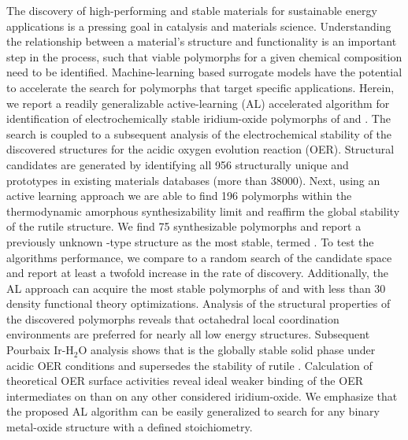 %



\noindent The discovery of high-performing and stable materials for sustainable energy applications is a pressing goal in catalysis and materials science.
%
Understanding the relationship between a material's structure and functionality is an important step in the process, such that viable polymorphs for a given chemical composition need to be identified.
%
Machine-learning based surrogate models have the potential to accelerate the search for polymorphs that target specific applications.
%
Herein, we report a readily generalizable active-learning (AL) accelerated algorithm for identification of electrochemically stable iridium-oxide polymorphs of \IrOtwo and \IrOthree.
%
The search is coupled to a subsequent analysis of the electrochemical stability of the discovered structures for the acidic oxygen evolution reaction (OER).
%
Structural candidates are generated by identifying all \num{956} structurally unique \ABtwo and \ABthree prototypes in existing materials databases (more than \num{38000}).
%
Next, using an active learning approach we are able to find \num{196} \IrOtwo polymorphs within the thermodynamic amorphous synthesizability limit and reaffirm the global stability of the rutile structure.
%
We find \num{75} synthesizable \IrOthree polymorphs and report a previously unknown -type structure as the most stable, termed \aIrOthree.
%
To test the algorithms performance,
we compare to a random search of the candidate space and report at least a twofold increase in the rate of discovery.
%
Additionally, the AL approach can acquire the most stable polymorphs of \IrOtwo and \IrOthree with less than \num{30} density functional theory optimizations.
%
Analysis of the structural properties of the discovered polymorphs reveals that octahedral local coordination environments are preferred for nearly all low energy structures.
%
Subsequent Pourbaix Ir-H$_2$O analysis shows that \aIrOthree is the globally stable solid phase under acidic OER conditions and supersedes the stability of rutile \IrOtwo.
%
Calculation of theoretical OER surface activities reveal ideal weaker binding of the OER intermediates on \aIrOthree than on any other considered iridium-oxide.
%
We emphasize that the proposed AL algorithm can be easily generalized to search for any binary metal-oxide structure with a defined stoichiometry.

